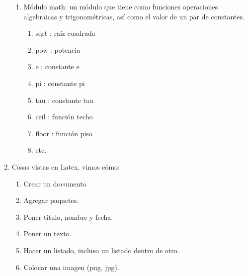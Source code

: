 \documentclass[letterpaper, 12pt, oneside]{article} %
\begin{document}
\begin{enumerate}
\begin{enumerate}
			\item Módulo math: un módulo que tiene como funciones operaciones algebraicas y trigonométricas, así como el valor de un par de constantes. 
			\begin{enumerate}
				\item sqrt : raíz cuadrada 
				\item pow : potencia 
				\item e : constante e
				\item pi : constante pi
				\item tau : constante tau
				\item ceil : función techo
				\item floor : función piso
				\item etc.
			\end{enumerate}
		\end{enumerate}
	    \item Cosas vistas en Latex, vimos cómo:
	    \begin{enumerate}
	    	\item Crear un documento
	    	\item Agregar paquetes.
	    	\item Poner título, nombre y fecha. 
	    	\item Poner un texto.
	    	\item Hacer un listado, incluso un listado dentro de otro.
	    	\item Colocar una imagen (png, jpg).
	    \end{enumerate}
	\end{enumerate}
\end{document}
